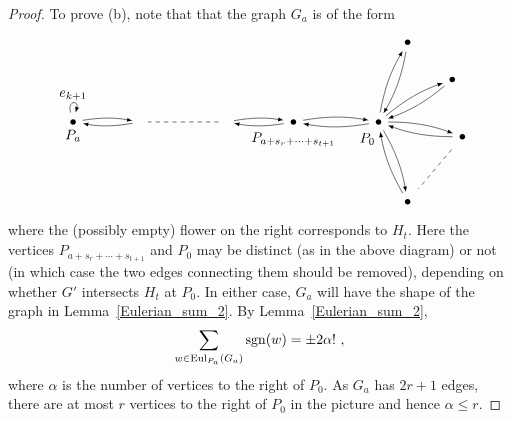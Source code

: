 \documentclass{amsproc}
\theoremstyle{definition}
\theoremstyle{remark}
\numberwithin{equation}{section}
\newcommand{\sgn}{{\rm sgn}}
\newcommand{\nodeDist}{2}
\newcommand{\uni}{{\rm Eul}}
\begin{document}
\begin{proof}
To prove (b), note that that the graph $G_a$ is of the form
\[
\begin{tikzpicture}[baseline,vertex/.style={anchor=base, circle, fill,minimum size=4pt, inner sep=0pt, outer sep=0pt},auto,
                               edge/.style={->,>=latex, shorten > = 5pt,shorten < = 5pt},
position/.style args={#1:#2 from #3}{
    at=(#3.#1), anchor=#1+180, shift=(#1:#2)
}]

  \node[vertex] (v0) {};
  \node[vertex,position = 180:{\nodeDist} from v0] (va1) {};
  \coordinate[position = 180:{\nodeDist*0.8} from va1] (va2) {};
  \coordinate[position = 180:{\nodeDist*1.1} from va2] (va3) {};
  \node[vertex,position = 180:{\nodeDist*0.8} from va3] (va4) {};
  \node[vertex,position = 70:{\nodeDist} from v0] (v1L) {};
  \node[vertex,position = 30:{\nodeDist} from v0] (v2L) {};
  \node[vertex,position = -10:{\nodeDist} from v0] (v3L) {};
  \node[vertex,position = -70:{\nodeDist} from v0] (v4L) {};

  \draw (v0) node[below=12, left=-1] {$P_0$};
  \draw (va4) node[below=2] {$P_{a}$};
  \draw (va1) node[below=4] {$P_{a+s_{r}+\dots+s_{t + 1}}$};
  \draw (v1L) node[above] {};
  \draw (v2L) node[left] {};
  \draw (v3L) node[left] {};
  \draw (v4L) node[below] {};

  \draw[edge] (va4) to [loop above] node[above] {$e_{k+1}$} (va4);

  \draw[edge] (v0) to [bend left=10] (va1);
  \draw[edge] (va1) to [bend left=10] (v0);

  \draw[edge] (va1) to [bend left=10] (va2);
  \draw[edge] (va2) to [bend left=10] (va1);

  \draw[dashed,shorten > = 6pt, shorten < = 6pt, bend right=10] (va2) -- (va3);

  \draw[edge] (va3) to [bend left=10] (va4);
  \draw[edge] (va4) to [bend left=10] (va3);

  \draw[edge] (v0) to [bend left=10] node[left] {} (v1L);
  \draw[edge] (v1L) to [bend left=10] node[right] {} (v0);

  \draw[edge] (v0) to [bend left=10] (v2L);
  \draw[edge] (v2L) to [bend left=10] (v0);

  \draw[edge] (v0) to [bend left=10] (v3L);
  \draw[edge] (v3L) to [bend left=10] (v0);

  \draw[dashed,shorten > = 10pt, shorten < = 10pt, bend right=10] (v3L) -- (v4L);

  \draw[edge] (v0) to [bend left=10] (v4L);
  \draw[edge] (v4L) to [bend left=10] (v0);
\end{tikzpicture}
\]
where the (possibly empty) flower on the right corresponds to $H_t$. Here the vertices $P_{a+s_r+\cdots+s_{t+1}}$ and $P_0$ may be distinct
(as in the above diagram) or not (in which case the two edges connecting them should be removed),
depending on whether $G'$ intersects $H_t$ at $P_0$. In either case, $G_a$ will have the shape of the graph in Lemma~\ref{Eulerian_sum_2}. By
Lemma~\ref{Eulerian_sum_2},
\[\sum_{w\in \uni_{P_a}(G_a)}\sgn(w)=\pm 2\alpha!\ ,\]
where $\alpha$ is the number of vertices to the right of $P_0$. As $G_a$ has $2r+1$ edges, there are at most $r$ vertices to the right of $P_0$ in the picture and hence $\alpha\leqslant r$.
\end{proof}
\end{document}
